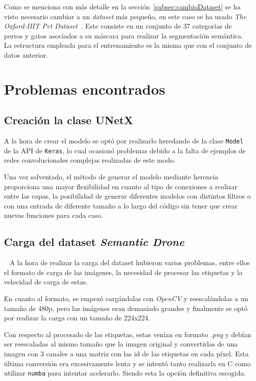 \documentclass[a4paper]{article}
\begin{document}
Como se menciona con m\'as detalle en la secci\'on~\ref{subsec:cambioDataset} se ha visto necesario cambiar a un \textit{dataset} m\'as peque\~no, en este caso se ha usado \textit{The Oxford-IIIT Pet Dataset}~\cite{petDataset}.
Este consiste en un conjunto de 37 categor\'ias de perros y gatos asociados a su m\'ascara para realizar la segmentaci\'on sem\'antica.
La estructura empleada para el entrenamiento es la misma que con el conjunto de datos anterior.


\section{Problemas encontrados}
\subsection{Creación la clase UNetX}
A la hora de crear el modelo se optó por realizarlo heredando de la clase \texttt{Model} de la API de \texttt{Keras}, lo cual ocasionó problemas debido a la falta de ejemplos de redes convolucionales complejas realizadas de este modo.
\newline

Una vez solventado, el m\'etodo de generar el modelo mediante herencia proporciona una mayor flexibilidad en cuanto al tipo de conexiones a realizar entre las capas, la posibilidad de generar diferentes modelos con distintos filtros o con una entrada de diferente tama\~no a lo largo del c\'odigo sin tener que crear nuevas funciones para cada caso.


\subsection{Carga del dataset \textit{Semantic Drone}}~\label{subsec:cargaDataset}
A la hora de realizar la carga del dataset hubieron varios problemas, entre ellos el formato de carga de las imágenes, la necesidad de procesar las etiquetas y la velocidad de carga de estas.\newline

En cuanto al formato, se empezó cargándolas con \textit{OpenCV} y reescal\'andolas a un tamaño de 480p, pero las imágenes eran demasiado grandes y finalmente se optó por realizar la carga con un tamaño de 224x224.\newline

Con respecto al procesado de las etiquetas, estas venían en formato \textit{.png} y debían ser reescaladas al mismo tamaño que la imagen original y convertirlas de una imagen con 3 canales a una matriz con las id de las etiquetas en cada píxel. Esta última conversión era excesivamente lenta y se intentó tanto realizarla en C como utilizar \texttt{numba} para intentar acelerarlo. Siendo esta la opción definitiva escogida.\newline
\end{document}
